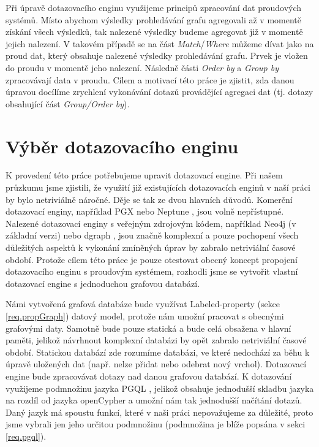 Při úpravě dotazovacího enginu využijeme principů zpracování dat proudových systémů.
Místo abychom výsledky prohledávání grafu agregovali až v momentě získání všech výsledků, tak nalezené výsledky budeme agregovat již v momentě jejich nalezení.
V takovém případě se na část \textit{Match}/\textit{Where} můžeme dívat jako na proud dat, který obsahuje nalezené výsledky prohledávání grafu.
Prvek je vložen do proudu v momentě jeho nalezení.
Následně části \textit{Order by} a \textit{Group by} zpracovávají data v proudu.
Cílem a motivací této práce je zjistit, zda danou úpravou docílíme zrychlení vykonávání dotazů provádějící agregaci dat (tj. dotazy obsahující část \textit{Group/Order by}).

\section*{Výběr dotazovacího enginu}

K provedení této práce potřebujeme upravit dotazovací engine.
Při našem průzkumu jsme zjistili, že využití již existujících dotazovacích enginů v naší práci by bylo netriviálně náročné.
Děje se tak ze dvou hlavních důvodů.
Komerční dotazovací enginy, například PGX \citep{pgx} nebo Neptune \citep{neptune}, jsou volně nepřístupné.
Nalezené dotazovací enginy s veřejným zdrojovým kódem, například Neo4j \citep{neopropertygraph} (v základní verzi) nebo dgraph \citep{dgraph}, jsou značně komplexní a pouze pochopení všech důležitých aspektů k vykonání zmíněných úprav by zabralo netriviální časové období.
Protože cílem této práce je pouze otestovat obecný koncept propojení dotazovacího enginu s proudovým systémem, rozhodli jsme se vytvořit vlastní dotazovací engine s jednoduchou grafovou databází.

Námi vytvořená grafová databáze bude využívat Labeled-property (sekce \ref{req.propGraph}) datový model, protože nám umožní pracovat s obecnými grafovými daty.
Samotně bude pouze statická a bude celá obsažena v hlavní paměti, jelikož návrhnout komplexní databázi by opět zabralo netriviální časové období.
Statickou databází zde rozumíme databázi, ve které nedochází za běhu k úpravě uložených dat (např. nelze přidat nebo odebrat nový vrchol).
Dotazovací engine bude zpracovávat dotazy nad danou grafovou databází.
K dotazování využijeme podmnožinu jazyka PGQL \citep{pgql}, jelikož obsahuje jednodušší skladbu jazyka na rozdíl od jazyka openCypher \citep{openCypher} a umožní nám tak jednodušší načítání dotazů.
Daný jazyk má spoustu funkcí, které v naši práci nepovažujeme za důležité, proto jsme vybrali jen jeho určitou podmnožinu (podmnožina je blíže popsána v sekci \ref{req.pgql}).


